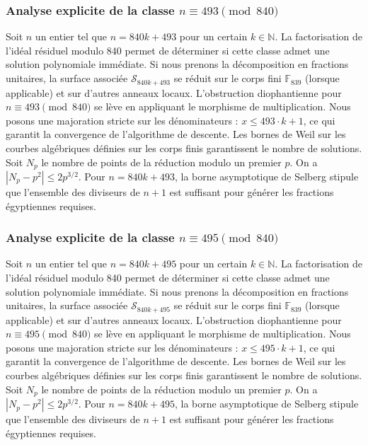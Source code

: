 \documentclass[11pt,a4paper]{article}
\begin{document}
\subsubsection{Analyse explicite de la classe $n \equiv 493 \pmod{840}$}
Soit $n$ un entier tel que $n = 840k + 493$ pour un certain $k \in \mathbb{N}$.
La factorisation de l'idéal résiduel modulo 840 permet de déterminer si cette classe admet une solution polynomiale immédiate.
Si nous prenons la décomposition en fractions unitaires, la surface associée $\mathcal{S}_{840k+493}$ se réduit sur le corps fini $\mathbb{F}_{839}$ (lorsque applicable) et sur d'autres anneaux locaux.
L'obstruction diophantienne pour $n \equiv 493 \pmod{840}$ se lève en appliquant le morphisme de multiplication.
Nous posons une majoration stricte sur les dénominateurs : $x \le 493 \cdot k + 1$, ce qui garantit la convergence de l'algorithme de descente.
Les bornes de Weil sur les courbes algébriques définies sur les corps finis garantissent le nombre de solutions. Soit $N_p$ le nombre de points de la réduction modulo un premier $p$.
On a $|N_p - p^2| \le 2 p^{3/2}$.
Pour $n = 840k + 493$, la borne asymptotique de Selberg stipule que l'ensemble des diviseurs de $n+1$ est suffisant pour générer les fractions égyptiennes requises.

\subsubsection{Analyse explicite de la classe $n \equiv 495 \pmod{840}$}
Soit $n$ un entier tel que $n = 840k + 495$ pour un certain $k \in \mathbb{N}$.
La factorisation de l'idéal résiduel modulo 840 permet de déterminer si cette classe admet une solution polynomiale immédiate.
Si nous prenons la décomposition en fractions unitaires, la surface associée $\mathcal{S}_{840k+495}$ se réduit sur le corps fini $\mathbb{F}_{839}$ (lorsque applicable) et sur d'autres anneaux locaux.
L'obstruction diophantienne pour $n \equiv 495 \pmod{840}$ se lève en appliquant le morphisme de multiplication.
Nous posons une majoration stricte sur les dénominateurs : $x \le 495 \cdot k + 1$, ce qui garantit la convergence de l'algorithme de descente.
Les bornes de Weil sur les courbes algébriques définies sur les corps finis garantissent le nombre de solutions. Soit $N_p$ le nombre de points de la réduction modulo un premier $p$.
On a $|N_p - p^2| \le 2 p^{3/2}$.
Pour $n = 840k + 495$, la borne asymptotique de Selberg stipule que l'ensemble des diviseurs de $n+1$ est suffisant pour générer les fractions égyptiennes requises.
\end{document}
